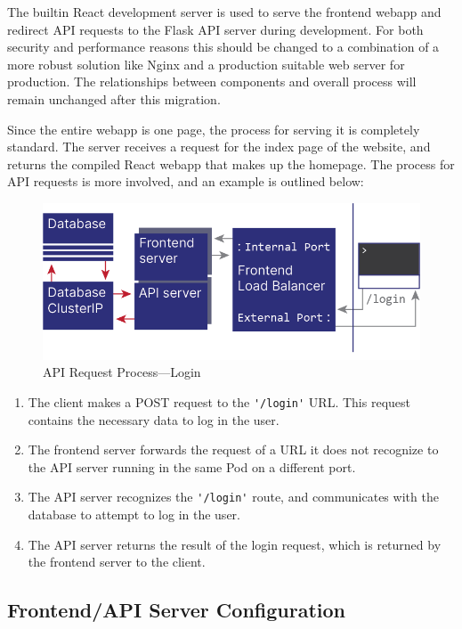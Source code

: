 \documentclass[12pt]{article}
\begin{document}
The builtin React development server is used to serve the frontend
webapp and redirect API requests to the Flask API server during
development.  For both security and performance reasons this should be
changed to a combination of a more robust solution like Nginx
\cite{nginx} and a production suitable web server for production.  The
relationships between components and overall process will remain
unchanged after this migration.
\par

Since the entire webapp is one page, the process for serving it is
completely standard.  The server receives a request for the index page
of the website, and returns the compiled React webapp that makes up
the homepage.  The process for API requests is more involved, and an
example is outlined below:

\begin{figure}[h!]

  \includegraphics[scale=.9]{login_request}
  \centering
  \caption{API Request Process---Login}
  \label{rr:detailed}
\end{figure}

\begin{enumerate}
\item The client makes a POST request to the \lstinline{'/login'} URL.
  This request contains the necessary data to log in the user.
\item The frontend server forwards the request of a URL it does not
  recognize to the API server running in the same Pod on a different
  port.
\item The API server recognizes the \lstinline{'/login'} route, and
  communicates with the database to attempt to log in the user.
\item The API server returns the result of the login request, which is
  returned by the frontend server to the client.
\end{enumerate}

\subsection{Frontend/API Server Configuration}
\end{document}
